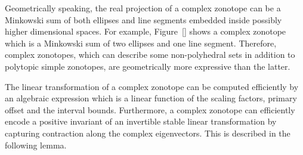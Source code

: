 %
Geometrically speaking, the real projection of a complex zonotope can
be a Minkowski sum of both ellipses and line segments embedded inside
possibly higher dimensional spaces.  For example, Figure~\ref{} shows
a complex zonotope which is a Minkowski sum of two ellipses and one
line segment.  Therefore, complex zonotopes, which can describe some
non-polyhedral sets in addition to polytopic simple zonotopes, are
geometrically more expressive than the latter.

The linear transformation of a complex zonotope can be computed
efficiently by an algebraic expression which is a linear function of
the scaling factors, primary offset and the interval bounds.
Furthermore, a complex zonotope can efficiently encode a positive
invariant of an invertible stable linear transformation by capturing
contraction along the complex eigenvectors.  This is described in the
following lemma.

